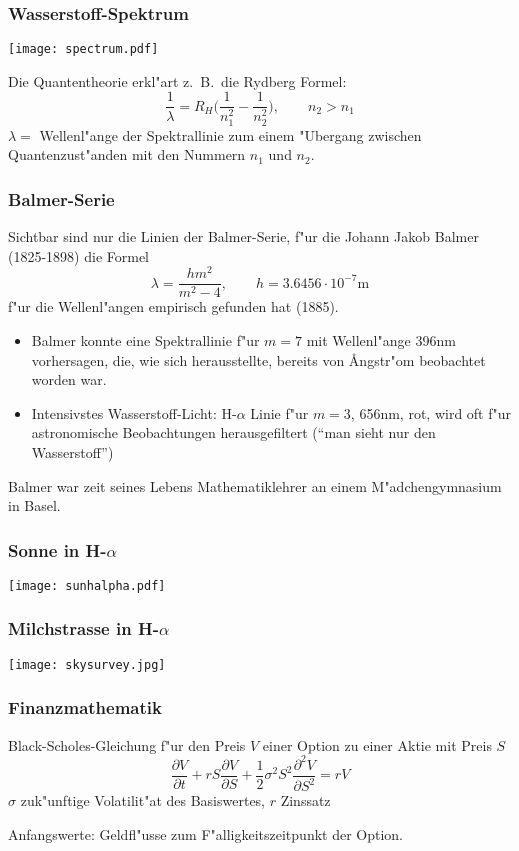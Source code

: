 \documentclass{beamer}
\begin{document}
\begin{frame}
\frametitle{Wasserstoff-Spektrum}
\begin{center}
\texttt{[image: spectrum.pdf]}
\end{center}
Die Quantentheorie erkl"art z.~B.~die Rydberg Formel:
\[
\frac1{\lambda}=R_H\biggl(\frac1{n_1^2}-\frac1{n_2^2}\biggr),\qquad n_2>n_1
\]
$\lambda=$ Wellenl"ange der Spektrallinie zum einem "Ubergang zwischen Quantenzust"anden
mit den Nummern $n_1$ und $n_2$.
\end{frame}

\begin{frame}
\frametitle{Balmer-Serie}
Sichtbar sind nur die Linien der Balmer-Serie, f"ur die 
Johann Jakob Balmer (1825-1898) die Formel
\[
\lambda=\frac{hm^2}{m^2-4},\qquad h=3.6456\cdot10^{-7}\text{m}
\]
f"ur die Wellenl"angen empirisch gefunden hat (1885).
\begin{itemize}
\item
Balmer konnte eine Spektrallinie f"ur $m=7$ mit Wellenl"ange 396nm
vorhersagen, die, wie sich herausstellte, bereits von \AA ngstr"om beobachtet
worden war.
\item 
Intensivstes Wasserstoff-Licht: H-$\alpha$ Linie f"ur $m=3$, 656nm, rot,
wird oft f"ur astronomische Beobachtungen herausgefiltert (``man sieht nur den
Wasserstoff'')
\end{itemize}

\medskip
Balmer war zeit seines Lebens Mathematiklehrer an einem M"adchengymnasium
in Basel.
\end{frame}

\begin{frame}
\frametitle{Sonne in H-$\alpha$}
\begin{center}
\texttt{[image: sunhalpha.pdf]}
\end{center}
\end{frame}

\begin{frame}
\frametitle{Milchstrasse in H-$\alpha$}
\begin{center}
\texttt{[image: skysurvey.jpg]}
\end{center}
\end{frame}

\begin{frame}
\frametitle{Finanzmathematik}
Black-Scholes-Gleichung f"ur den Preis $V$ einer Option zu einer Aktie mit Preis
$S$
\[
\frac{\partial V}{\partial t}
+
rS\frac{\partial V}{\partial S}
+
\frac12\sigma^2S^2\frac{\partial^2 V}{\partial S^2}=rV
\]
$\sigma$ zuk"unftige Volatilit"at des Basiswertes, $r$ Zinssatz

Anfangswerte: Geldfl"usse zum F"alligkeitszeitpunkt der Option.

\end{frame}
\end{document}
